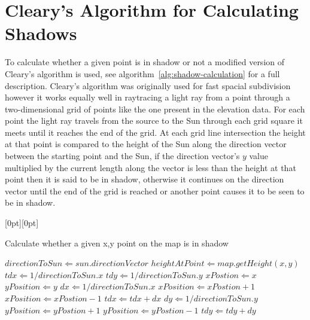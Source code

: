 \documentclass[12pt]{report}
\newcommand{\note}[1]{\raisebox{0pt}[0pt][0pt]{\pdfcomment[open=true]{#1}}}
\begin{document}
\section{Cleary's Algorithm for Calculating Shadows}
To calculate whether a given point is in shadow or not a modified version of Cleary's algorithm is used, see algorithm~\ref{alg:shadow-calculation} for a full description. Cleary's algorithm was originally used for fast spacial subdivision however it works equally well in raytracing a light ray from a point through a two-dimensional grid of points like the one present in the elevation data. For each point the light ray travels from the source to the Sun through each grid square it meets until it reaches the end of the grid. At each grid line intersection the height at that point is compared to the height of the Sun along the direction vector between the starting point and the Sun, if the direction vector's $y$ value multiplied by the current length along the vector is less than the height at that point then it is said to be in shadow, otherwise it continues on the direction vector until the end of the grid is reached or another point causes it to be seen to be in shadow.


\begin{algorithm}[h]
\note{I have no idea how to make this look better}
\caption{Calculate whether a given x,y point on the map is in shadow}
\label{alg:shadow-calculation}%
\begin{algorithmic}           %
\STATE $directionToSun \Leftarrow sun.directionVector$
\STATE $heightAtPoint \Leftarrow map.getHeight(x,y)$
\STATE $tdx \Leftarrow 1 / directionToSun.x$
\STATE $tdy \Leftarrow 1 / directionToSun.y$
\STATE $xPostion \Leftarrow x$
\STATE $yPosition \Leftarrow y$
	\ENDIF
		\STATE $dx \Leftarrow 1 / directionToSun.x$
			\STATE $xPosition \Leftarrow xPostion + 1$	
		\ELSE
			\STATE $xPosition \Leftarrow xPostion - 1$	
		\ENDIF
		\STATE $tdx \Leftarrow tdx + dx$
	\ELSE
		\STATE $dy \Leftarrow 1 / directionToSun.y$
			\STATE $yPosition \Leftarrow yPostion + 1$	
		\ELSE
			\STATE $yPosition \Leftarrow yPostion - 1$	
		\ENDIF
		\STATE $tdy \Leftarrow tdy + dy$		
	\ENDIF
\ENDWHILE
{}
\end{algorithmic}
\end{algorithm}
\end{document}
